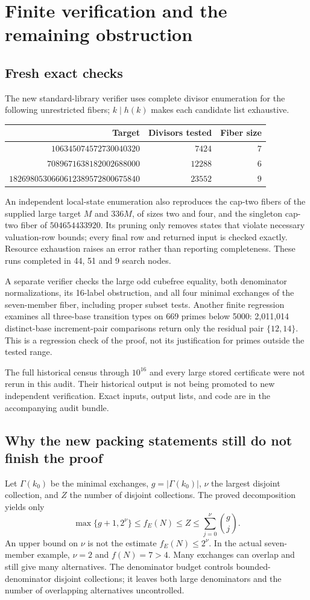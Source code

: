 \documentclass[11pt,a4paper]{article}
\theoremstyle{remark}
\begin{document}
\section{Finite verification and the remaining obstruction}
\subsection{Fresh exact checks}
The new standard-library verifier uses complete divisor enumeration for the
following unrestricted fibers; $k\mid h(k)$ makes each candidate list exhaustive.
\begin{center}\small
\begin{tabular}{@{}r r r@{}}
\toprule Target & Divisors tested & Fiber size\\\midrule
$106345074572730040320$ & $7424$ & $7$\\
$7089671638182002688000$ & $12288$ & $6$\\
$1826980530660612389572800675840$ & $23552$ & $9$\\
\bottomrule
\end{tabular}
\end{center}
An independent local-state enumeration also reproduces the cap-two fibers
of the supplied large target $M$ and $336M$, of sizes two and four, and the
singleton cap-two fiber of $504654433920$. Its pruning only removes states
that violate necessary valuation-row bounds; every final row and returned
input is checked exactly. Resource exhaustion raises an error rather than
reporting completeness. These runs completed in 44, 51 and 9 search nodes.

A separate verifier checks the large odd cubefree equality, both denominator
normalizations, its 16-label obstruction, and all four minimal exchanges of
the seven-member fiber, including proper subset tests. Another finite
regression examines all three-base transition types on 669 primes below
5000: 2,011,014 distinct-base increment-pair comparisons return only the
residual pair $\{12,14\}$. This is a regression check of the proof, not its
justification for primes outside the tested range.

The full historical census through $10^{16}$ and every large stored
certificate were not rerun in this audit. Their historical output is not
being promoted to new independent verification. Exact inputs, output lists,
and code are in the accompanying audit bundle.

\subsection{Why the new packing statements still do not finish the proof}
Let $\Gamma(k_0)$ be the minimal exchanges, $g=|\Gamma(k_0)|$, $\nu$ the
largest disjoint collection, and $Z$ the number of disjoint collections.
The proved decomposition yields only
\[
 \max\{g+1,2^\nu\}\le f_E(N)\le Z
 \le\sum_{j=0}^{\nu}\binom gj.
\]
An upper bound on $\nu$ is not the estimate $f_E(N)\le2^\nu$. In the
actual seven-member example, $\nu=2$ and $f(N)=7>4$. Many exchanges can
overlap and still give many alternatives. The denominator budget controls
bounded-denominator disjoint collections; it leaves both large denominators
and the number of overlapping alternatives uncontrolled.
\end{document}
